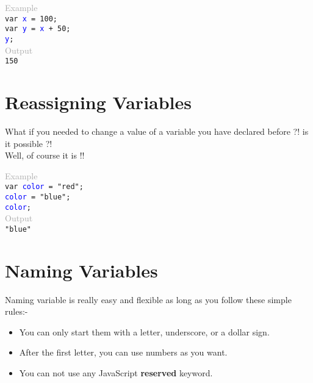 \documentclass {book}
\begin{document}
	\begin{tcolorbox}
		\scriptsize
		\textcolor{darkgrey}{Example}\\
		
		\texttt{\textcolor{defcolor}{var} \textcolor{blue}{x} = \textcolor{numbercolor}{100};}\\
		
		\texttt{\textcolor{defcolor}{var} \textcolor{blue}{y} = \textcolor{blue}{x} + \textcolor{numbercolor}{50};}\\
		
		\texttt{\textcolor{blue}{y};}\\
		
		\textcolor{darkgrey}{Output}\\
		
		\texttt{\textcolor{numbercolor}{150}}
		
	\end{tcolorbox}
	
	\section{Reassigning Variables}
	What if you needed to change a value of a variable you have declared before ?! is it possible ?!\\
	Well, of course it is !!
	
	\begin{tcolorbox}
		\scriptsize
		\textcolor{darkgrey}{Example}\\
		
		\texttt{\textcolor{defcolor}{var} \textcolor{blue}{color} = \textcolor{stringcolor}{"red"};}\\
		
		\texttt{\textcolor{blue}{color} = \textcolor{stringcolor}{"blue"};}\\
		
		\texttt{\textcolor{blue}{color};}\\
		
		\textcolor{darkgrey}{Output}\\
		
		\texttt{\textcolor{stringcolor}{"blue"}}
		
	\end{tcolorbox}
	
	\section{Naming Variables}
	Naming variable is really easy and flexible as long as you follow these simple rules:-
	\begin{itemize}
		\item You can only start them with a letter, underscore, or a dollar sign.
		\item After the first letter, you can use numbers as you want.
		\item You can not use any JavaScript \textbf{\textcolor{darkyellow}{reserved}} keyword.
		
	\end{itemize}
	 
\end{document}
